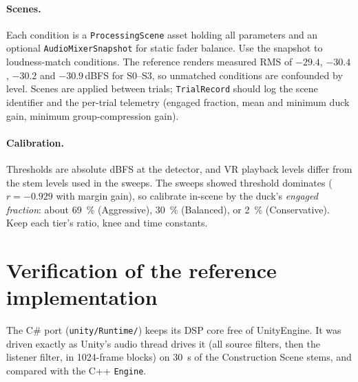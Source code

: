 \documentclass[11pt]{article}
\newcommand{\code}[1]{\texttt{#1}}
\begin{document}
\paragraph{Scenes.}
Each condition is a \code{ProcessingScene} asset holding all parameters and
an optional \code{AudioMixerSnapshot} for static fader balance. Use the
snapshot to loudness-match conditions. The reference renders measured RMS of
$-29.4$, $-30.4$, $-30.2$ and $-30.9$\,dBFS for S0--S3, so unmatched
conditions are confounded by level. Scenes are applied between trials;
\code{TrialRecord} should log the scene identifier and the per-trial telemetry
(engaged fraction, mean and minimum duck gain, minimum group-compression gain).

\paragraph{Calibration.}
Thresholds are absolute dBFS at the detector, and VR playback levels differ
from the stem levels used in the sweeps. The sweeps showed threshold dominates
($r=-0.929$ with margin gain), so calibrate in-scene by the duck's
\emph{engaged fraction}: about \SI{69}{\percent} (Aggressive),
\SI{30}{\percent} (Balanced), or \SI{2}{\percent} (Conservative). Keep each
tier's ratio, knee and time constants.

\section{Verification of the reference implementation}
\label{sec:verify}

The C\# port (\code{unity/Runtime/}) keeps its DSP core free of UnityEngine.
It was driven exactly as Unity's audio thread drives it (all source filters,
then the listener filter, in 1024-frame blocks) on \SI{30}{\second} of the
Construction Scene stems, and compared with the C++ \code{Engine}.
\end{document}
